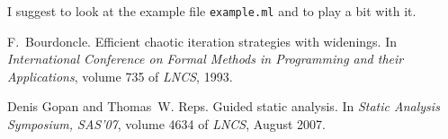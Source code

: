 \documentclass[twoside,10pt,a4paper]{report}
\begin{document}
I suggest to look at the example file \texttt{example.ml}
and to play a bit with it.

\begin{thebibliography}{Bou93}

F.~Bourdoncle.
\newblock Efficient chaotic iteration strategies with widenings.
\newblock In {\em International Conference on Formal Methods in Programming and
  their Applications}, volume 735 of {\em LNCS}, 1993.

Denis Gopan and Thomas~W. Reps.
\newblock Guided static analysis.
\newblock In {\em Static Analysis Symposium, SAS'07}, volume 4634 of {\em
  LNCS}, August 2007.

\end{thebibliography}

%
%




\appendix
\printindex
\end{document}
